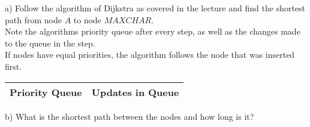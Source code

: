 a) Follow the algorithm of Dijkstra as covered in the lecture and find the shortest path from node $A$ to node $MAXCHAR$.\\
Note the algorithms priority queue after every step, as well as the changes made to the queue in the step.\\
If nodes have equal priorities, the algorithm follows the node that was inserted first.\\
\newpage
\begin{center}
    \begin{tabular}{|P{8cm}|P{6cm}|}
        \hline
        Priority Queue & Updates in Queue\\
        \hline
        \hline
    \end{tabular}
\end{center}
b) What is the shortest path between the nodes and how long is it?\\
\begin{center}
    \noindent{}
\end{center}
